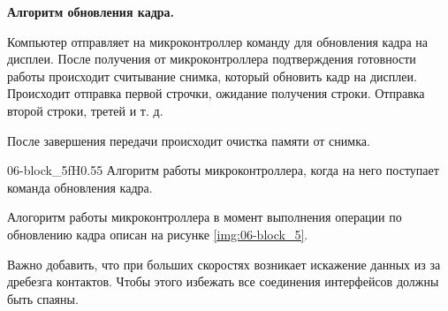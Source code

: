 	\textbf{Алгоритм обновления кадра.}
	
	Компьютер отправляет на микроконтроллер команду для обновления кадра на дисплеи. После получения от микроконтроллера подтверждения готовности работы происходит считывание снимка, который обновить кадр на дисплеи. Происходит отправка первой строчки, ожидание получения строки. Отправка второй строки, третей и т. д.
	
	После завершения передачи происходит очистка памяти от снимка.
	
	{06-block_5}{f}{H}{0.55\textwidth}
	{Алгоритм работы микроконтроллера, когда на него поступает команда обновления кадра.} %
	
	Алогоритм работы микроконтроллера в момент выполнения операции по обновлению кадра описан на рисунке \ref{img:06-block_5}.
	
	Важно добавить, что при больших скоростях возникает искажение данных из за дребезга контактов. Чтобы этого избежать все соединения интерфейсов должны быть спаяны.
	
	